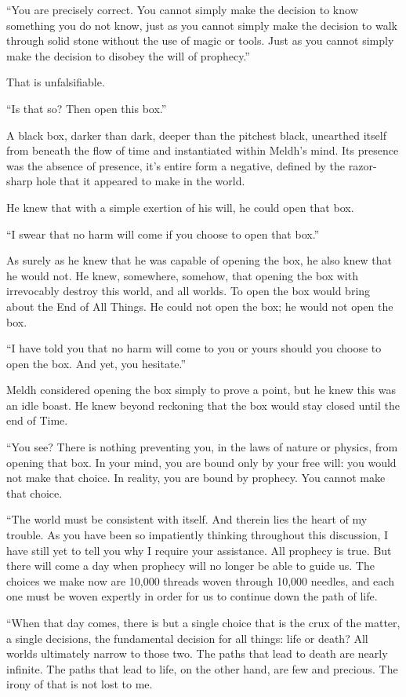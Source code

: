 “You are precisely correct. You cannot simply make the decision to know something you do not know, just as you cannot simply make the decision to walk through solid stone without the use of magic or tools. Just as you cannot simply make the decision to disobey the will of prophecy.”

That is unfalsifiable.

“Is that so? Then open this box.”

A black box, darker than dark, deeper than the pitchest black, unearthed itself from beneath the flow of time and instantiated within Meldh’s mind. Its presence was the absence of presence, it’s entire form a negative, defined by the razor-sharp hole that it appeared to make in the world.

He knew that with a simple exertion of his will, he could open that box.

“I swear that no harm will come if you choose to open that box.”

As surely as he knew that he was capable of opening the box, he also knew that he would not. He knew, somewhere, somehow, that opening the box with irrevocably destroy this world, and all worlds. To open the box would bring about the End of All Things. He could not open the box; he would not open the box.

“I have told you that no harm will come to you or yours should you choose to open the box. And yet, you hesitate.”

Meldh considered opening the box simply to prove a point, but he knew this was an idle boast. He knew beyond reckoning that the box would stay closed until the end of Time.

“You see? There is nothing preventing you, in the laws of nature or physics, from opening that box. In your mind, you are bound only by your free will: you would not make that choice. In reality, you are bound by prophecy. You cannot make that choice.

“The world must be consistent with itself. And therein lies the heart of my trouble. As you have been so impatiently thinking throughout this discussion, I have still yet to tell you why I require your assistance. All prophecy is true. But there will come a day when prophecy will no longer be able to guide us. The choices we make now are 10,000 threads woven through 10,000 needles, and each one must be woven expertly in order for us to continue down the path of life.

“When that day comes, there is but a single choice that is the crux of the matter, a single decisions, the fundamental decision for all things: life or death? All worlds ultimately narrow to those two. The paths that lead to death are nearly infinite. The paths that lead to life, on the other hand, are few and precious. The irony of that is not lost to me.

